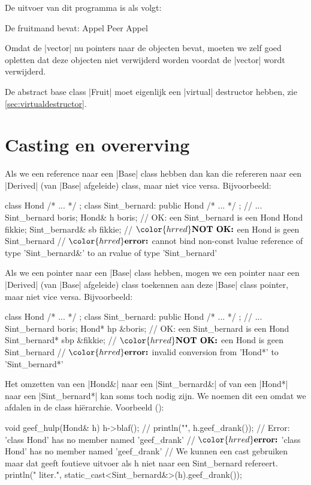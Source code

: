 \begin{cpplstShortInline}
De uitvoer van dit programma is als volgt:
\begin{coutput}
De fruitmand bevat:
  Appel
  Peer
  Appel
\end{coutput}

Omdat de |vector| nu pointers naar de objecten bevat, moeten we zelf goed opletten dat deze objecten niet verwijderd worden voordat de |vector| wordt verwijderd.

De abstract base class |Fruit| moet eigenlijk een |virtual| destructor hebben, zie \cref{sec:virtualdestructor}. 

\section{Casting en overerving}
Als we een reference naar een |Base| class hebben dan kan die refereren naar een |Derived| (van |Base| afgeleide) class, maar niet vice versa. Bijvoorbeeld:
\begin{cpplstfragment}[mathescape=true]
class Hond { /* ... */ };
class Sint_bernard: public Hond { /* ... */ };
//  ...
	Sint_bernard boris;
	Hond& h {boris}; // OK: een Sint_bernard is een Hond
	Hond fikkie;
	Sint_bernard& sb {fikkie}; // $\color{hrred}\textbf{NOT OK:}$ een Hond is geen Sint_bernard
//  $\color{hrred}\textbf{error:}$ cannot bind non-const lvalue reference of type 'Sint_bernard&' to an rvalue of type 'Sint_bernard'
\end{cpplstfragment}

Als we een pointer naar een |Base| class hebben, mogen we een pointer naar een |Derived| (van |Base| afgeleide) class toekennen aan deze |Base| class pointer, maar niet vice versa. Bijvoorbeeld:
\begin{cpplstfragment}[mathescape=true]
class Hond { /* ... */ };
class Sint_bernard: public Hond { /* ... */ };
//  ...
	Sint_bernard boris;
    Hond* hp {&boris}; // OK: een Sint_bernard is een Hond
    Sint_bernard* sbp {&fikkie}; // $\color{hrred}\textbf{NOT OK:}$ een Hond is geen Sint_bernard
//  $\color{hrred}\textbf{error:}$ invalid conversion from 'Hond*' to 'Sint_bernard*'
\end{cpplstfragment}

Het omzetten van een |Hond&| naar een |Sint_bernard&| of van een |Hond*| naar een |Sint_bernard*| kan soms toch nodig zijn.
We noemen dit een \emph{} omdat we afdalen in de class hiërarchie.
Voorbeeld ():
\begin{cpplstfragment}[mathescape=true]
void geef_hulp(Hond& h) { 
    h->blaf();
//  println("{}", h.geef_drank());
//  Error: 'class Hond' has no member named 'geef_drank'
//  $\color{hrred}\textbf{error:}$ 'class Hond' has no member named 'geef_drank'
//  We kunnen een cast gebruiken maar dat geeft foutieve uitvoer als h niet naar een Sint_bernard refereert.
    println("{} liter.", static_cast<Sint_bernard&>(h).geef_drank());
}
\end{cpplstfragment}


\end{cpplstShortInline}
